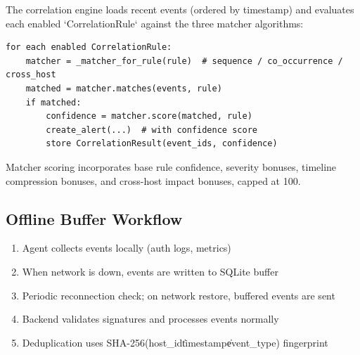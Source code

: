 The correlation engine loads recent events (ordered by timestamp) and evaluates each enabled `CorrelationRule` against the three matcher algorithms:

\begin{verbatim}
for each enabled CorrelationRule:
    matcher = _matcher_for_rule(rule)  # sequence / co_occurrence / cross_host
    matched = matcher.matches(events, rule)
    if matched:
        confidence = matcher.score(matched, rule)
        create_alert(...)  # with confidence score
        store CorrelationResult(event_ids, confidence)
\end{verbatim}

Matcher scoring incorporates base rule confidence, severity bonuses, timeline compression bonuses, and cross-host impact bonuses, capped at 100.

\subsection{Offline Buffer Workflow}

\begin{enumerate}
    \item Agent collects events locally (auth logs, metrics)
    \item When network is down, events are written to SQLite buffer
    \item Periodic reconnection check; on network restore, buffered events are sent
    \item Backend validates signatures and processes events normally
    \item Deduplication uses SHA-256(host\_id\|timestamp\|event\_type) fingerprint
\end{enumerate}